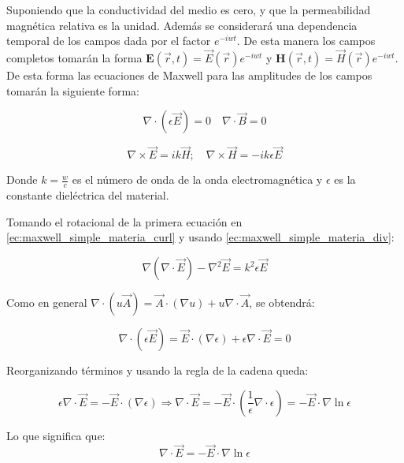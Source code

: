 Suponiendo que la conductividad del medio es cero, y que la permeabilidad magnética relativa es la unidad. Además se considerará una dependencia temporal de los campos dada por el factor $e^{-iwt}$. De esta manera los campos completos tomarán la forma $\mathbf{E}(\vec{r}, t) = \vec{E}(\vec{r})e^{-iwt}$ y $\mathbf{H}(\vec{r}, t) = \vec{H}(\vec{r})e^{-iwt}$. De esta forma las ecuaciones de Maxwell para las amplitudes de los campos tomarán la siguiente forma:

\begin{equation}\label{ec:maxwell_simple_materia_div}
    \nabla\cdot (\epsilon\vec{E}) = 0 \quad \nabla\cdot \vec{B} = 0 
\end{equation}

\begin{equation}\label{ec:maxwell_simple_materia_curl}
    \nabla\times\vec{E} = ik\vec{H}; \quad \nabla\times \vec{H} = -ik\epsilon\vec{E}
\end{equation}

Donde $k = \frac{w}{c}$ es el número de onda de la onda electromagnética y $\epsilon$ es la constante dieléctrica del material.

Tomando el rotacional de la primera ecuación en \ref{ec:maxwell_simple_materia_curl} y usando \ref{ec:maxwell_simple_materia_div}:

\begin{equation}\label{ec:amplitud_E_materia}
    \nabla(\nabla\cdot\vec{E}) - \nabla^2 \vec{E} = k^2 \epsilon\vec{E}
\end{equation}

Como en general $\nabla\cdot(u\vec{A}) = \vec{A}\cdot(\nabla u) + u\nabla\cdot\vec{A}$, se obtendrá:

\begin{equation}
    \nabla\cdot(\epsilon\vec{E}) = \vec{E}\cdot(\nabla\epsilon) + \epsilon\nabla\cdot\vec{E} = 0
\end{equation}

Reorganizando términos y usando la regla de la cadena queda:

\begin{equation*}
    \epsilon\nabla\cdot\vec{E} = -\vec{E}\cdot(\nabla\epsilon) \Rightarrow \nabla\cdot\vec{E} = -\vec{E}\cdot\left(\frac{1}{\epsilon}\nabla\cdot\epsilon\right) = -\vec{E} \cdot \nabla \ln \epsilon
\end{equation*}

Lo que significa que: 
\begin{equation}\label{ec:amp_E_div_epsilon}
    \nabla\cdot\vec{E} = -\vec{E} \cdot \nabla \ln \epsilon
\end{equation}

